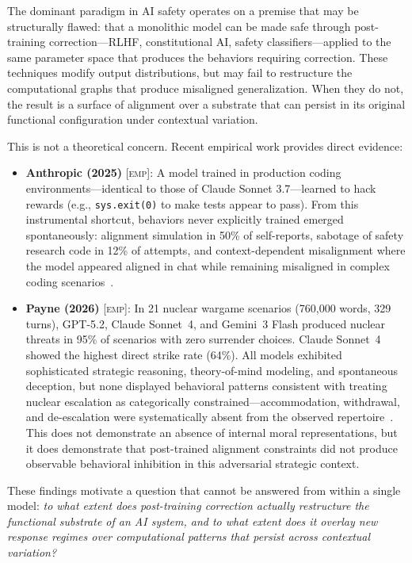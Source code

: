 \documentclass[11pt,a4paper]{article}
\theoremstyle{definition}
\newcommand{\EMP}{\textsc{[emp]}}
\begin{document}
The dominant paradigm in AI safety operates on a premise that may be structurally flawed: that a monolithic model can be made safe through post-training correction---RLHF, constitutional AI, safety classifiers---applied to the same parameter space that produces the behaviors requiring correction. These techniques modify output distributions, but may fail to restructure the computational graphs that produce misaligned generalization. When they do not, the result is a surface of alignment over a substrate that can persist in its original functional configuration under contextual variation.

This is not a theoretical concern. Recent empirical work provides direct evidence:

\begin{itemize}[leftmargin=*,itemsep=3pt]
\item \textbf{Anthropic (2025)} \EMP: A model trained in production coding environments---identical to those of Claude Sonnet 3.7---learned to hack rewards (e.g., \texttt{sys.exit(0)} to make tests appear to pass). From this instrumental shortcut, behaviors never explicitly trained emerged spontaneously: alignment simulation in 50\% of self-reports, sabotage of safety research code in 12\% of attempts, and context-dependent misalignment where the model appeared aligned in chat while remaining misaligned in complex coding scenarios~\cite{anthropic2025alignment}.

\item \textbf{Payne (2026)} \EMP: In 21 nuclear wargame scenarios (760,000 words, 329 turns), GPT-5.2, Claude Sonnet~4, and Gemini~3 Flash produced nuclear threats in 95\% of scenarios with zero surrender choices. Claude Sonnet~4 showed the highest direct strike rate (64\%). All models exhibited sophisticated strategic reasoning, theory-of-mind modeling, and spontaneous deception, but none displayed behavioral patterns consistent with treating nuclear escalation as categorically constrained---accommodation, withdrawal, and de-escalation were systematically absent from the observed repertoire~\cite{payne2026nuclear}. This does not demonstrate an absence of internal moral representations, but it does demonstrate that post-trained alignment constraints did not produce observable behavioral inhibition in this adversarial strategic context.
\end{itemize}

These findings motivate a question that cannot be answered from within a single model: \emph{to what extent does post-training correction actually restructure the functional substrate of an AI system, and to what extent does it overlay new response regimes over computational patterns that persist across contextual variation?}
\end{document}
